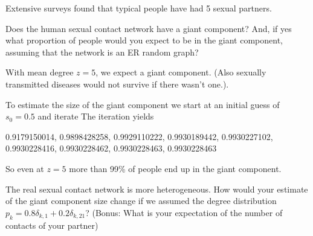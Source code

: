 Extensive surveys found that typical people have had 5 sexual partners. 

\subquestion Does the human sexual contact network have a giant component? And, if yes what proportion of people would you expect to be in the giant component, assuming that the network is an ER random graph? 

\solution
With mean degree $z=5$, we expect a giant component. (Also sexually transmitted diseases would not survive if there wasn't one.). 

To estimate the size of the giant component we start at an initial guess of $s_0=0.5$ and iterate 
The iteration yields 
\begin{center}
0.9179150014,
0.9898428258,
0.9929110222,
0.9930189442,
0.9930227102,
0.9930228416,
0.9930228462,
0.9930228463,
0.9930228463
\end{center}
So even at $z=5$ more than 99\% of people end up in the giant component. 

\subquestion 
The real sexual contact network is more heterogeneous. How would your estimate of the giant component size change if we assumed the degree distribution $p_k=0.8 \delta_{k,1} + 0.2 \delta_{k,21}$?
(Bonus: What is your expectation of the number of contacts of your partner)

